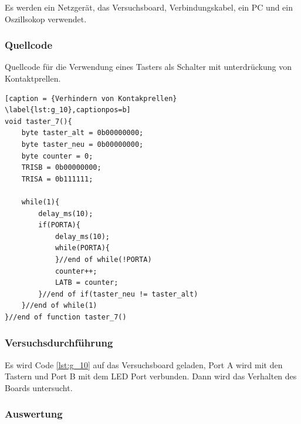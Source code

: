 \documentclass[12pt,a4paper]{article}
\begin{document}
Es werden ein Netzgerät, das Versuchsboard, Verbindungskabel, ein PC und ein Oszillsokop verwendet.

\subsubsection*{Quellcode}

Quellcode für die Verwendung eines Tasters als Schalter mit unterdrückung von Kontaktprellen.

\lstset{language=C, basicstyle=\tiny}
\begin{lstlisting}[caption = {Verhindern von Kontakprellen} \label{lst:g_10},captionpos=b]
void taster_7(){
	byte taster_alt = 0b00000000;
	byte taster_neu = 0b00000000;
	byte counter = 0;
	TRISB = 0b00000000;
	TRISA = 0b111111;
	
	while(1){
		delay_ms(10);
		if(PORTA){
			delay_ms(10);
			while(PORTA){
			}//end of while(!PORTA)
			counter++;
			LATB = counter;
		}//end of if(taster_neu != taster_alt)
	}//end of while(1)
}//end of function taster_7()
\end{lstlisting}

\subsubsection*{Versuchsdurchführung}

Es wird Code \ref{lst:g_10} auf das Versuchsboard geladen, Port A wird mit den Tastern und Port B mit dem LED Port verbunden. Dann wird das Verhalten des Boards untersucht.

\subsubsection*{Auswertung}
\end{document}

